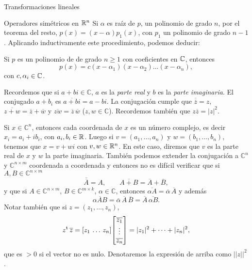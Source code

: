\begin{chapter}{Transformaciones lineales}
\begin{section}{Operadores simétricos en $\mathbb R^n$}
    Si $\alpha$ es raíz de $p$, un polinomio de grado $n$, por  el teorema del resto,  $p(x) = (x-\alpha)p_1(x)$, con  $p_1$ un polinomio de grado $n-1$.  Aplicando inductivamente este procedimiento, podemos deducir:
    
    \begin{corolario} Si $p$ es un polinomio de de grado $n\ge 1$ con coeficientes en $\mathbb C$,  entonces
        \begin{equation*}
            p(x)= c(x-\alpha_1)(x-\alpha_2)\ldots(x-\alpha_n),
        \end{equation*}
        con $c,\alpha_i \in \mathbb C$.
    \end{corolario}
    
    
    \begin{obs}\label{5.9} 	Recordemos que si $a+bi \in \mathbb{C}$, $a$ es la \textit{parte real} y $b$ es la \textit{parte imaginaria}. El conjugado $a+b_i$ es $\overline{a +bi} = a-bi$. La conjugación cumple que $\overline{\overline{z}} = z$, $\overline{z +w} = \overline{z}+\overline{w}$ y $\overline{z w} = \overline{z}\,\overline{w}$ ($z,w \in \mathbb{C}$). Recordemos también que $z\overline{z} = |z|^2$.
        
        Si $x \in \mathbb{C}^n$,  entonces cada coordenada de $x$ es un número complejo,  es decir $x_i = a_i + ib_i$, con $a_i,b_i \in \mathbb R$. Luego si $v = (a_1,\ldots,a_n)$ y $w = (b_1,\ldots,b_n)$, tenemos que  $x = v + wi$  con  $v,w \in \mathbb R^n$.  En  este caso, diremos que $v$  es la parte real de $x$ y $w$ la parte imaginaria. También podemos extender la conjugación a $\mathbb{C}^n$ y  $\mathbb{C}^{n \times m}$ coordenada a coordenada y entonces no es difícil verificar que si $A, B \in \mathbb{C}^{n \times m}$
        \begin{equation*}\overline{\overline{A}} = A,\qquad \overline{A+B} = \overline{A}+\overline{B},
        \end{equation*}
        y que si $A\in \mathbb{C}^{n \times m}$, $ B \in \mathbb{C}^{m \times k}$, $\alpha \in \mathbb{C}$, entonces $\overline{\alpha A} =\overline{\alpha}\, \overline{A}$ y además
        \begin{equation*}\overline{\alpha A B} =\overline{\alpha}\, \overline{A}\,\overline{B} = \overline{A}\,\overline{\alpha B}.
        \end{equation*} 
        Notar también que si  $z = (z_1,\ldots,z_n)$, 
        \begin{equation*}z^{\operatorname{t}} \, \overline{z} = [ z_1 \, \ldots \, z_n ]
        {\begin{bmatrix} \overline{z_1} \\\vdots \\\overline{z_n} \end{bmatrix}} = |z_1|^2+\cdots+|z_n|^2,
        \end{equation*}   
        que es $>0$ si el vector no es nulo. Denotaremos la expresión de arriba como $||z||^2$.
        

\end{obs}
\end{section}
\end{chapter}
